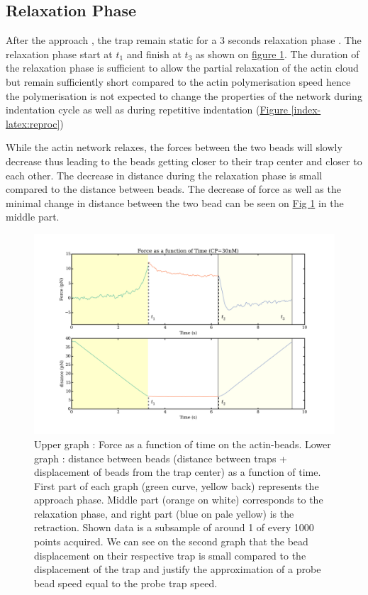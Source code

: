 \documentclass[A4paperpaper,11pt,english]{sphinxmanual}
\begin{document}
\subsection{Relaxation Phase}
\label{index-latex:relaxation-phase}
After the approach , the trap remain static for a 3 seconds relaxation phase
. The relaxation phase start at \(t_1\) and
finish at \(t_3\) as shown on \hyperref[index-latex:figindent-time]{figure  \ref*{index-latex:figindent-time}}. The duration of the relaxation phase is sufficient to allow the partial
relaxation of the actin cloud  but remain sufficiently short compared to
the actin polymerisation speed hence the polymerisation is not expected to
change the properties of the network during indentation cycle as well as
during repetitive indentation (\hyperref[index-latex:reproc]{Figure  \ref*{index-latex:reproc}})

While the actin network relaxes, the forces between the two beads will slowly
decrease thus leading to the beads getting closer to their trap center and
closer to each other. The decrease in distance during the relaxation phase is
small compared to the distance between beads. The decrease of force as well as
the minimal change in distance between the two bead can be seen on \hyperref[index-latex:figindent-time]{Fig  \ref*{index-latex:figindent-time}}
in the middle part.
\begin{figure}[htbp]
\centering
\capstart

\includegraphics[width=0.700\linewidth]{force_time.png}
\caption{Upper graph : Force as a function of time on the actin-beads.  Lower graph
: distance between beads (distance between traps + displacement of beads
from the trap center) as a function of time. First part of each graph
(green curve, yellow back) represents the approach phase. Middle part
(orange on white) corresponds to the relaxation phase, and right part (blue on pale
yellow) is the retraction.  Shown data is a subsample of around 1 of every
1000 points acquired. We can see on the second graph that the bead
displacement on their respective trap is small compared to the
displacement of the trap and justify the approximation of a probe bead
speed equal to the probe trap speed.}\label{index-latex:figindent-time}\end{figure}
\end{document}
